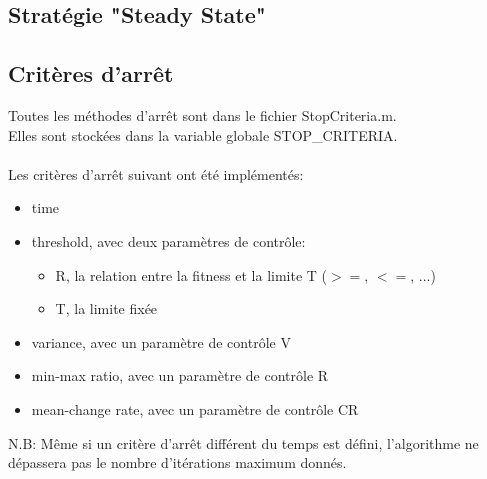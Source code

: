 \documentclass[12pt, letterpaper]{article}
\begin{document}
\subsection{Stratégie "Steady State" }

\subsection{Critères d'arrêt}

Toutes les méthodes d'arrêt sont dans le fichier StopCriteria.m.\\
Elles sont stockées dans la variable globale STOP\_CRITERIA.
\\\\
Les critères d'arrêt suivant ont été implémentés:
\begin{itemize}
\item time\\
  
\item threshold, avec deux paramètres de contrôle:
  \begin{itemize}
  \item R, la relation entre la fitness et la limite T ($>=$, $<=$,
    ...)\\
    
  \item T, la limite fixée\\
  \end{itemize}
	
\item variance, avec un paramètre de contrôle V\\
	
\item min-max ratio, avec un paramètre de contrôle R\\
	
\item mean-change rate, avec un paramètre de contrôle CR\\
\end{itemize}

N.B: Même si un critère d'arrêt différent du temps est défini,
l'algorithme ne dépassera pas le nombre d'itérations maximum donnés.
\end{document}
